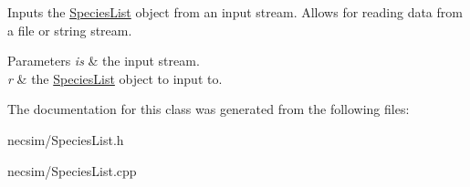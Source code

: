 Inputs the \hyperlink{class_species_list}{Species\+List} object from an input stream. Allows for reading data from a file or string stream. 


\begin{DoxyParams}{Parameters}
{\em is} & the input stream. \\
\hline
{\em r} & the \hyperlink{class_species_list}{Species\+List} object to input to. \\
\hline
\end{DoxyParams}


The documentation for this class was generated from the following files\+:\begin{DoxyCompactItemize}
\item 
necsim/Species\+List.\+h\item 
necsim/Species\+List.\+cpp\end{DoxyCompactItemize}
